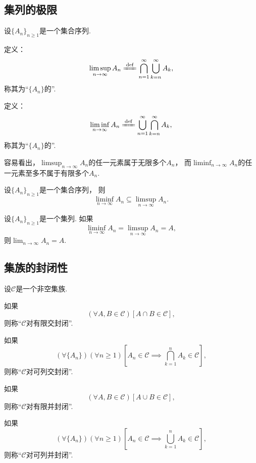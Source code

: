 \subsection{集列的极限}
\begin{definition}
设\(\{A_n\}_{n\geq1}\)是一个集合序列.

定义：\[
	\limsup_{n\to\infty} A_n
	\defeq
	\bigcap_{n=1}^\infty
	\bigcup_{k=n}^\infty
	A_k,
\]
称其为“\(\{A_n\}\)的”.

定义：\[
	\liminf_{n\to\infty} A_n
	\defeq
	\bigcup_{n=1}^\infty
	\bigcap_{k=n}^\infty
	A_k,
\]
称其为“\(\{A_n\}\)的”.
\end{definition}
容易看出，\(\limsup_{n\to\infty} A_n\)的任一元素属于无限多个\(A_n\)，
而\(\liminf_{n\to\infty} A_n\)的任一元素至多不属于有限多个\(A_n\).

\begin{proposition}
设\(\{A_n\}_{n\geq1}\)是一个集合序列，
则\begin{equation}
	\liminf_{n\to\infty} A_n
	\subseteq
	\limsup_{n\to\infty} A_n.
\end{equation}
\end{proposition}

\begin{theorem}
设\(\{A_n\}_{n\geq1}\)是一个集列.
如果\[
	\liminf_{n\to\infty} A_n
	= \limsup_{n\to\infty} A_n
	= A,
\]
则\(\lim_{n\to\infty} A_n = A\).
\end{theorem}

\subsection{集族的封闭性}
\begin{definition}[集族的封闭性]
设\(\mathcal{C}\)是一个非空集族.

如果\[
	(\forall A,B\in\mathcal{C})
	[A \cap B \in \mathcal{C}],
\]
则称“\(\mathcal{C}\)对有限交封闭”.

如果\[
	(\forall \{A_n\})
	(\forall n\geq1)
	\left[A_n\in\mathcal{C} \implies \bigcap_{k=1}^n A_k \in \mathcal{C}\right],
\]
则称“\(\mathcal{C}\)对可列交封闭”.

如果\[
	(\forall A,B\in\mathcal{C})
	[A \cup B \in \mathcal{C}],
\]
则称“\(\mathcal{C}\)对有限并封闭”.

如果\[
	(\forall \{A_n\})
	(\forall n\geq1)
	\left[A_n\in\mathcal{C} \implies \bigcup_{k=1}^n A_k \in \mathcal{C}\right],
\]
则称“\(\mathcal{C}\)对可列并封闭”.
\end{definition}

